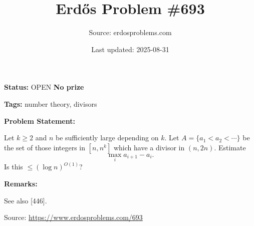 \documentclass{article}
\title{Erd\H{o}s Problem \#693}
\date{Last updated: 2025-08-31}
\author{Source: erdosproblems.com}
\begin{document}
\maketitle

\noindent\textbf{Status:} OPEN \quad \textbf{No prize}

\noindent\textbf{Tags:} number theory, divisors

\medskip
\noindent\textbf{Problem Statement:}

Let $k\geq 2$ and $n$ be sufficiently large depending on $k$. Let $A=\{a_1<a_2<\cdots \}$ be the set of those integers in $[n,n^k]$ which have a divisor in $(n,2n)$. Estimate\[\max_{i} a_{i+1}-a_i.\]Is this $\leq (\log n)^{O(1)}$?

\bigskip
\noindent\textbf{Remarks:}

See also [446].

\bigskip
\noindent\small{Source: \url{https://www.erdosproblems.com/693}}
\end{document}
